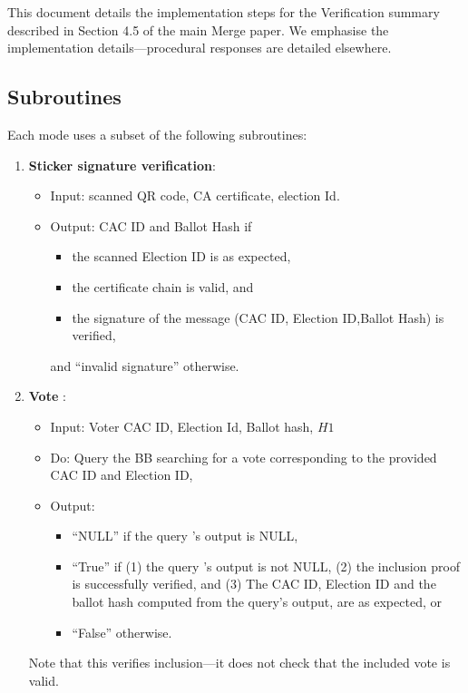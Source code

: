 \documentclass{article}
\begin{document}
    This document details the implementation steps for the Verification summary described in Section 4.5 of the main Merge paper. We emphasise the implementation details---procedural responses are detailed elsewhere.

\subsection{Subroutines}
Each mode uses a subset of the following subroutines:

\begin{enumerate}
    \item \textbf{Sticker signature verification}:
\begin{itemize}
    \item Input: scanned QR code,  CA certificate, election Id.
    \item Output: CAC ID and Ballot Hash if 
    \begin{itemize}
        \item the scanned Election ID is as expected, 
        \item the certificate chain is valid, and
        \item the signature of the message (CAC ID, Election ID,Ballot Hash) is verified,
    \end{itemize}
    and ``invalid signature'' otherwise.
\end{itemize}
\label{Sticker signature verification}
    \item \textbf{Vote \BBInclusionCheck{}}:

\begin{itemize}
    \item    Input: Voter CAC ID, Election Id, Ballot hash, $H1$
    \item     Do: Query the BB  searching for a vote corresponding to the provided CAC ID and Election ID,
    \item Output: 
    \begin{itemize}
        \item ``NULL'' if the query 's output is NULL,
        \item ``True'' if (1) the query 's output is not NULL, (2) the inclusion proof is successfully verified, and
        (3) The CAC ID, Election ID and the ballot hash computed from the query's output, are as expected, or
        \item ``False'' otherwise.
    \end{itemize}

\end{itemize}
    Note that this verifies inclusion---it does not check that the included vote is valid.


\end{enumerate}
\end{document}
